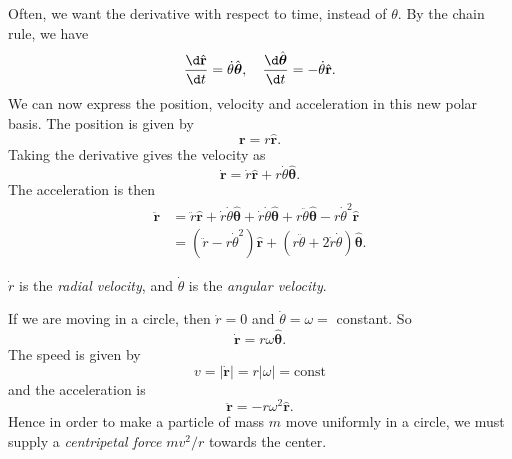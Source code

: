 \documentclass[a4paper]{article}
\begin{document}
Often, we want the derivative with respect to time, instead of $\theta$. By the chain rule, we have
\[
  \frac{\d \hat{\mathbf{r}}}{\d t} = \dot{\theta}\hat{\boldsymbol\theta},\quad \frac{\d \hat{\boldsymbol\theta}}{\d t} = -\dot{\theta} \hat{\mathbf{r}}.
\]
We can now express the position, velocity and acceleration in this new polar basis. The position is given by
\[
  \mathbf{r} = r\hat{\mathbf{r}}.
\]
Taking the derivative gives the velocity as
\[
  \dot{\mathbf{r}} = \dot{r} \hat{\mathbf{r}} + r\dot{\theta} \hat{\boldsymbol\theta}.
\]
The acceleration is then
\begin{align*}
  \ddot{\mathbf{r}} &= \ddot{r} \hat{\mathbf{r}} + \dot{r}\dot{\theta}\hat{\boldsymbol\theta} + \dot{r}\dot{\theta}\hat{\boldsymbol\theta} + r\ddot{\theta}\hat{\boldsymbol\theta} - r\dot{\theta}^2\hat{\mathbf{r}}\\
  &= (\ddot{r} - r\dot{\theta}^2)\hat{\mathbf{r}} + (r\ddot{\theta} + 2\dot{r}\dot{\theta})\hat{\boldsymbol\theta}.
\end{align*}
\begin{defi}
  $\dot{r}$ is the \emph{radial velocity}, and $\dot{\theta}$ is the \emph{angular velocity}.
\end{defi}

\begin{eg}
  If we are moving in a circle, then $\dot{r} = 0$ and $\dot{\theta} = \omega = $ constant. So
  \[
    \dot{\mathbf{r}} = r\omega\hat{\boldsymbol\theta}.
  \]
  The speed is given by
  \[
    v = |\dot{\mathbf{r}}| = r|\omega| = \text{const}
  \]
  and the acceleration is
  \[
    \ddot{\mathbf{r}} = -r\omega^2 \hat{\mathbf{r}}.
  \]
  Hence in order to make a particle of mass $m$ move uniformly in a circle, we must supply a \emph{centripetal force} $mv^2/r$ towards the center.
\end{eg}
\end{document}
